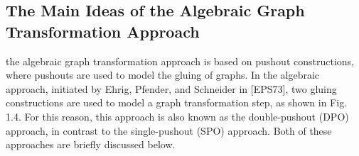 \subsection{The Main Ideas of the Algebraic Graph Transformation Approach}
the algebraic graph transformation approach is based on pushout constructions, where pushouts are used to model the gluing of graphs. In the algebraic approach, initiated by Ehrig, Pfender, and Schneider in [EPS73], two gluing constructions are used to model a graph transformation step, as shown in Fig. 1.4. For this reason, this approach is also known as the double-pushout (DPO) approach, in contrast to the single-pushout (SPO) approach. Both of these approaches are briefly discussed below.